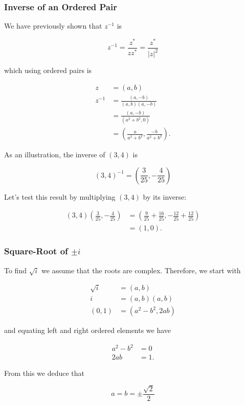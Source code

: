 \documentclass[10pt]{article}
\begin{document}
\subsubsection{Inverse of an Ordered Pair}
We have previously shown that $z^{-1}$ is

$$
z^{-1}=\frac{z^{*}}{z z^{*}}=\frac{z^{*}}{|z|^{2}}
$$

which using ordered pairs is

$$
\begin{aligned}
z & =(a, b) \\
z^{-1} & =\frac{(a,-b)}{(a, b)(a,-b)} \\
& =\frac{(a,-b)}{\left(a^{2}+b^{2}, 0\right)} \\
& =\left(\frac{a}{a^{2}+b^{2}}, \frac{-b}{a^{2}+b^{2}}\right) .
\end{aligned}
$$

As an illustration, the inverse of $(3,4)$ is

$$
(3,4)^{-1}=\left(\frac{3}{25},-\frac{4}{25}\right)
$$

Let's test this result by multiplying $(3,4)$ by its inverse:

$$
\begin{aligned}
(3,4)\left(\frac{3}{25},-\frac{4}{25}\right) & =\left(\frac{9}{25}+\frac{16}{25},-\frac{12}{25}+\frac{12}{25}\right) \\
& =(1,0) .
\end{aligned}
$$

\subsubsection{Square-Root of $\pm i$}
To find $\sqrt{i}$ we assume that the roots are complex. Therefore, we start with

$$
\begin{aligned}
\sqrt{i} & =(a, b) \\
i & =(a, b)(a, b) \\
(0,1) & =\left(a^{2}-b^{2}, 2 a b\right)
\end{aligned}
$$

and equating left and right ordered elements we have

$$
\begin{aligned}
a^{2}-b^{2} & =0 \\
2 a b & =1 .
\end{aligned}
$$

From this we deduce that

$$
a=b= \pm \frac{\sqrt{2}}{2}
$$
\end{document}
